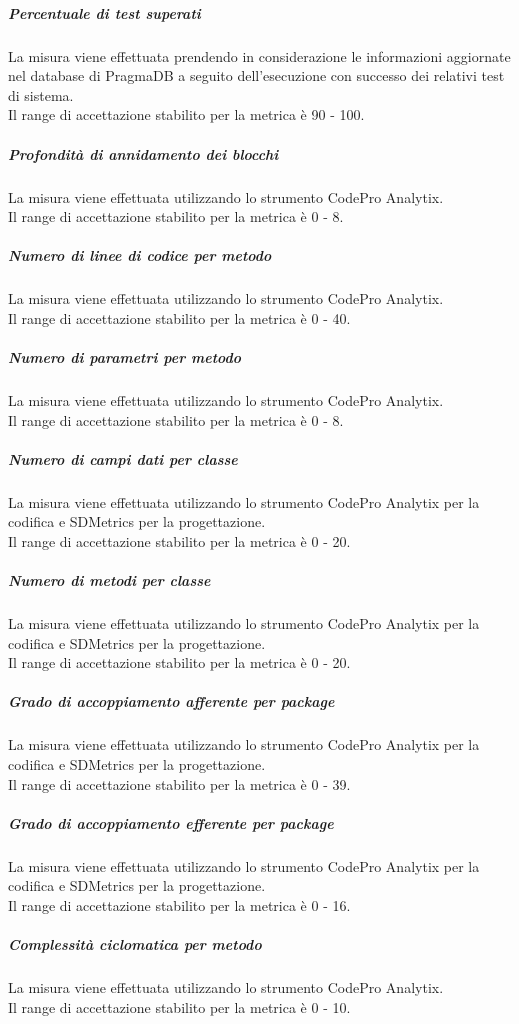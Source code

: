 			\subparagraph{Percentuale di test superati}
			La misura viene effettuata prendendo in considerazione le informazioni aggiornate nel database di PragmaDB a seguito dell'esecuzione con successo dei relativi test di sistema.
			\\Il range di accettazione stabilito per la metrica è 90 - 100.
			
			\subparagraph{Profondità di annidamento dei blocchi}
			La misura viene effettuata utilizzando lo strumento CodePro Analytix.
			\\Il range di accettazione stabilito per la metrica è 0 - 8.
			
			\subparagraph{Numero di linee di codice per metodo}
			La misura viene effettuata utilizzando lo strumento CodePro Analytix.
			\\Il range di accettazione stabilito per la metrica è 0 - 40.
			
			\subparagraph{Numero di parametri per metodo}
			La misura viene effettuata utilizzando lo strumento CodePro Analytix.
			\\Il range di accettazione stabilito per la metrica è 0 - 8.
			
			\subparagraph{Numero di campi dati per classe}
			La misura viene effettuata utilizzando lo strumento CodePro Analytix per la codifica e SDMetrics per la progettazione.
			\\Il range di accettazione stabilito per la metrica è 0 - 20.
			
			\subparagraph{Numero di metodi per classe}
			La misura viene effettuata utilizzando lo strumento CodePro Analytix per la codifica e SDMetrics per la progettazione.
			\\Il range di accettazione stabilito per la metrica è 0 - 20.
			
			\subparagraph{Grado di accoppiamento afferente per package}
			La misura viene effettuata utilizzando lo strumento CodePro Analytix per la codifica e SDMetrics per la progettazione.
			\\Il range di accettazione stabilito per la metrica è 0 - 39.
			
			\subparagraph{Grado di accoppiamento efferente per package}
			La misura viene effettuata utilizzando lo strumento CodePro Analytix per la codifica e SDMetrics per la progettazione.
			\\Il range di accettazione stabilito per la metrica è 0 - 16.
			
			\subparagraph{Complessità ciclomatica per metodo}
			La misura viene effettuata utilizzando lo strumento CodePro Analytix.
			\\Il range di accettazione stabilito per la metrica è 0 - 10.
			
